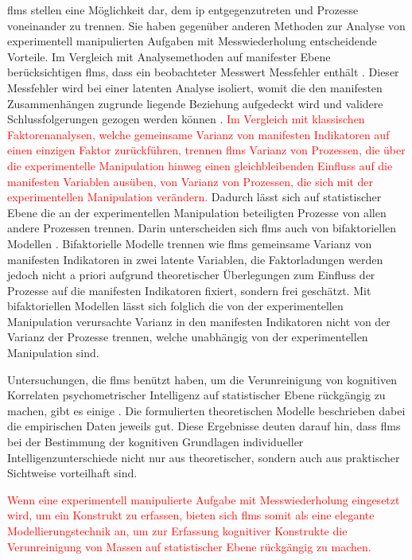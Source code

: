 \documentclass[11pt, twoside, a4paper]{book}		%
\begin{document}
\glspl{flm} stellen eine Möglichkeit dar, dem \gls{ip} entgegenzutreten und Prozesse voneinander zu trennen. Sie haben gegenüber anderen Methoden zur Analyse von experimentell manipulierten Aufgaben mit Messwiederholung entscheidende Vorteile.
Im Vergleich mit Analysemethoden auf manifester Ebene berücksichtigen \glspl{flm}, dass ein beobachteter Messwert Messfehler enthält \citep{Moosbrugger2007}. Dieser Messfehler wird bei einer latenten Analyse isoliert, womit die den manifesten Zusammenhängen zugrunde liegende Beziehung aufgedeckt wird und validere Schlussfolgerungen gezogen werden können \citep[S. 9]{Kline2011}.
\textcolor{red}{
Im Vergleich mit klassischen Faktorenanalysen, welche gemeinsame Varianz von manifesten Indikatoren auf einen einzigen Faktor zurückführen, trennen \glspl{flm} Varianz von Prozessen, die über die experimentelle Manipulation hinweg einen gleichbleibenden Einfluss auf die manifesten Variablen ausüben, von Varianz von Prozessen, die sich mit der experimentellen Manipulation verändern.}
Dadurch lässt sich auf statistischer Ebene die an der experimentellen Manipulation beteiligten Prozesse von allen andere Prozessen trennen.
Darin unterscheiden sich \glspl{flm} auch von bifaktoriellen Modellen \citep[z. B.][]{Moosbrugger2006, Schweizer2010}. Bifaktorielle Modelle trennen wie \glspl{flm} gemeinsame Varianz von manifesten Indikatoren in zwei latente Variablen, die Faktorladungen werden jedoch nicht a priori aufgrund theoretischer Überlegungen zum Einfluss der Prozesse auf die manifesten Indikatoren fixiert, sondern frei geschätzt. Mit bifaktoriellen Modellen lässt sich folglich die von der experimentellen Manipulation verursachte Varianz in den manifesten Indikatoren nicht von der Varianz der Prozesse trennen, welche unabhängig von der experimentellen Manipulation sind.

Untersuchungen, die \glspl{flm} benützt haben, um die Verunreinigung von kognitiven Korrelaten psychometrischer Intelligenz auf statistischer Ebene rückgängig zu machen, gibt es einige \citep[z. B.][]{Ren2013, Schweizer2007, Stankov2007, Wang2015}. Die formulierten theoretischen Modelle beschrieben dabei die empirischen Daten jeweils gut. Diese Ergebnisse deuten darauf hin, dass \glspl{flm} bei der Bestimmung der kognitiven Grundlagen individueller Intelligenzunterschiede nicht nur aus theoretischer, sondern auch aus praktischer Sichtweise vorteilhaft sind. 

\textcolor{red}{
Wenn eine experimentell manipulierte Aufgabe mit Messwiederholung eingesetzt wird, um ein Konstrukt zu erfassen, bieten sich \glspl{flm} somit als eine elegante Modellierungstechnik an, um zur Erfassung kognitiver Konstrukte die Verunreinigung von Massen auf statistischer Ebene rückgängig zu machen.}
\end{document}
